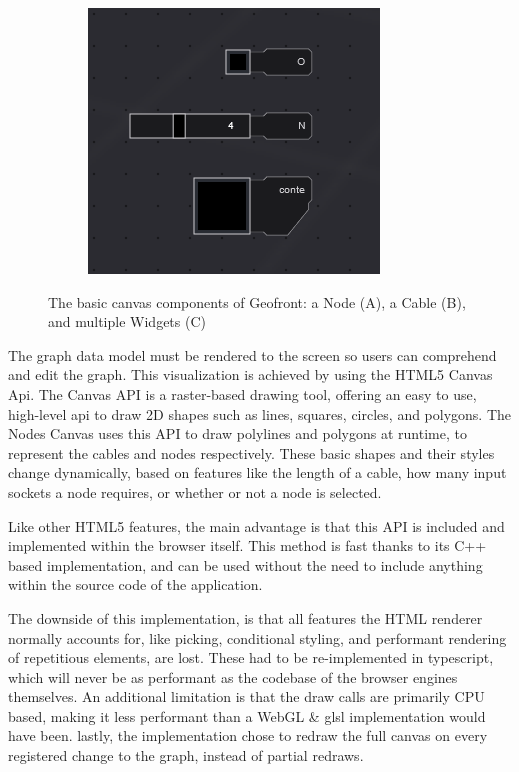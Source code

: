 \begin{figure}
\begin{subfigure}[b]{0.30\linewidth}
    \graphicspath{ {../../assets/images/implementation/} }
    \centering
    \includegraphics[width=\linewidth]{widgets.png}
    \caption{}\label{fig:node-cable:3}
  \end{subfigure}%
  \caption[Nodes, Widgets and Cables]{The basic canvas components of Geofront: a Node (A), a Cable (B), and multiple Widgets (C) }
  \label{fig:node-cable}
\end{figure}

The graph data model must be rendered to the screen so users can comprehend and edit the graph. 
This visualization is achieved by using the HTML5 Canvas Api. 
The Canvas API is a raster-based drawing tool, offering an easy to use, high-level api to draw 2D shapes such as lines, squares, circles, and polygons. 
The Nodes Canvas uses this API to draw polylines and polygons at runtime, to represent the cables and nodes respectively. 
These basic shapes and their styles change dynamically, based on features like the length of a cable, how many input sockets a node requires, or whether or not a node is selected. 

Like other HTML5 features, the main advantage is that this API is included and implemented within the browser itself. This method is fast thanks to its C++ based implementation, and can be used without the need to include anything within the source code of the application.

The downside of this implementation, is that all features the HTML renderer normally accounts for, like picking, conditional styling, and performant rendering of repetitious elements, are lost.
These had to be re-implemented in typescript, which will never be as performant as the codebase of the browser engines themselves. 
An additional limitation is that the draw calls are primarily CPU based, 
making it less performant than a WebGL \& glsl implementation would have been.
lastly, the implementation chose to redraw the full canvas on every registered change to the graph, instead of partial redraws. 

